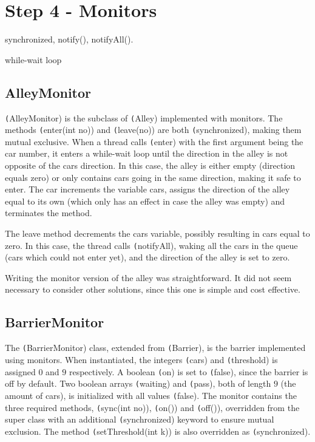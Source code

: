 \section*{Step 4 - Monitors}
synchronized, notify(), notifyAll().

while-wait loop
\subsection{AlleyMonitor}
\texttt(AlleyMonitor) is the subclass of \texttt(Alley) implemented with monitors. The methods \texttt(enter(int no)) and \texttt(leave(no)) are both \texttt(synchronized), making them mutual exclusive. When a thread calls \texttt(enter) with the first argument being the car number, it enters a while-wait loop until the direction in the alley is not opposite of the cars direction. In this case, the alley is either empty (direction equals zero) or only contains cars going in the same direction, making it safe to enter. The car increments the variable cars, assigns the direction of the alley equal to its own (which only has an effect in case the alley was empty) and terminates the method.

The leave method decrements the cars variable, possibly resulting in cars equal to zero. In this case, the thread calls \texttt(notifyAll), waking all the cars in the queue (cars which could not enter yet), and the direction of the alley is set to zero.

Writing the monitor version of the alley was straightforward. It did not seem necessary to consider other solutions, since this one is simple and cost effective.

\subsection*{BarrierMonitor}
The \texttt(BarrierMonitor) class, extended from \texttt(Barrier), is the barrier implemented using monitors. When instantiated, the integers \texttt(cars) and \texttt(threshold) is assigned $0$ and $9$ respectively. A boolean \texttt(on) is set to \texttt(false), since the barrier is off by default. Two boolean arrays \texttt(waiting) and \texttt(pass), both of length $9$ (the amount of cars), is initialized with all values \texttt(false). The monitor contains the three required methods, \texttt(sync(int no)), \texttt(on()) and \texttt(off()), overridden from the super class with an additional \texttt(synchronized) keyword to ensure mutual exclusion. The method \texttt(setThreshold(int k)) is also overridden as \texttt(synchronized).

